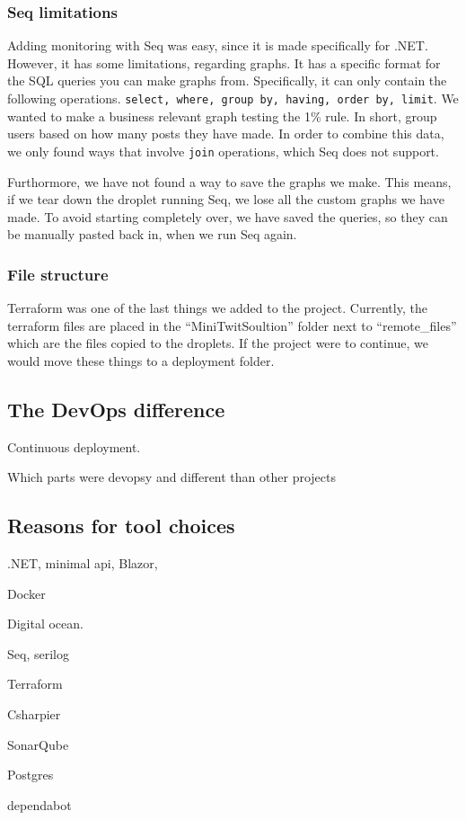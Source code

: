 \subsubsection{Seq limitations}

Adding monitoring with Seq was easy, since it is made specifically for .NET.
However, it has some limitations, regarding graphs.
It has a specific format for the SQL queries you can make graphs from.
Specifically, it can only contain the following operations.
\texttt{select, where, group by, having, order by, limit}.
We wanted to make a business relevant graph testing the 1\% rule\cite{1_perc_rule}.
In short, group users based on how many posts they have made.
In order to combine this data, we only found ways that involve 
\texttt{join} operations, which Seq does not support.

Furthormore, we have not found a way to save the graphs we make.
This means, if we tear down the droplet running Seq,
we lose all the custom graphs we have made.
To avoid starting completely over, we have saved the queries,
so they can be manually pasted back in, when we run Seq again.

\subsubsection{File structure}

Terraform was one of the last things we added to the project.
Currently, the terraform files are placed in the ``MiniTwitSoultion'' 
folder next to ``remote_files'' which are the files copied to the droplets.
If the project were to continue, we would move these things to a deployment folder.

\subsection{The DevOps difference}

Continuous deployment. 

Which parts were devopsy and different than other projects

\subsection{Reasons for tool choices}

.NET, minimal api, Blazor,

Docker

Digital ocean.

Seq, serilog

Terraform

Csharpier

SonarQube

Postgres

dependabot